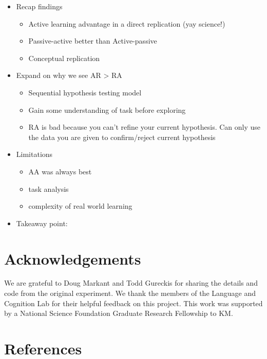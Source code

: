\documentclass[10pt, letterpaper]{article}
\begin{document}
\begin{itemize}
\itemsep1pt\parskip0pt
\item
  Recap findings

  \begin{itemize}
  \itemsep1pt\parskip0pt
  \item
    Active learning advantage in a direct replication (yay science!)
  \item
    Passive-active better than Active-passive
  \item
    Conceptual replication
  \end{itemize}
\item
  Expand on why we see AR \textgreater{} RA

  \begin{itemize}
  \itemsep1pt\parskip0pt
  \item
    Sequential hypothesis testing model
  \item
    Gain some understanding of task before exploring
  \item
    RA is bad because you can't refine your current hypothesis. Can only
    use the data you are given to confirm/reject current hypothesis
  \end{itemize}
\item
  Limitations

  \begin{itemize}
  \itemsep1pt\parskip0pt
  \item
    AA was always best
  \item
    task analysis
  \item
    complexity of real world learning
  \end{itemize}
\item
  Takeaway point:
\end{itemize}

\section{Acknowledgements}\label{acknowledgements}

We are grateful to Doug Markant and Todd Gureckis for sharing the
details and code from the original experiment. We thank the members of
the Language and Cognition Lab for their helpful feedback on this
project. This work was supported by a National Science Foundation
Graduate Research Fellowship to KM.

\section{References}\label{references}
\end{document}

